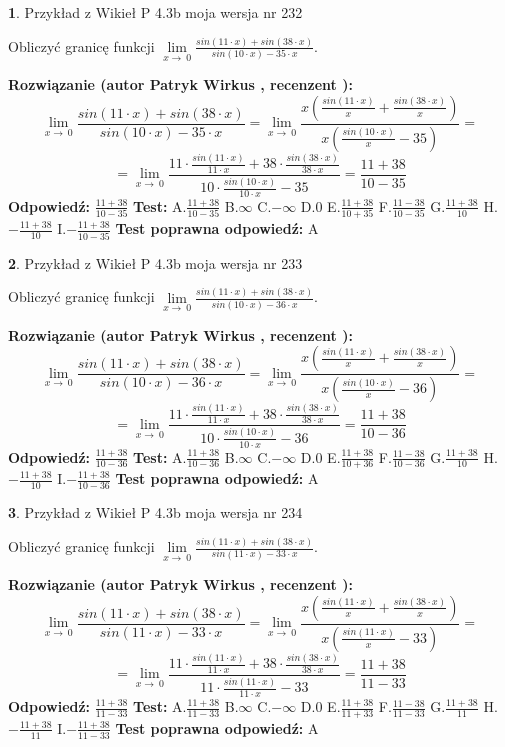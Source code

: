 \documentclass[12pt, a4paper]{article}
\theoremstyle{definition} %
\newtheorem{zad}{}
\newcommand{\zadStart}[1]{\begin{zad}#1\newline}
\newcommand{\zadStop}{\end{zad}}
\newcommand{\rozwStart}[2]{\noindent \textbf{Rozwiązanie (autor #1 , recenzent #2): }\newline}
\newcommand{\rozwStop}{\newline}
\newcommand{\odpStart}{\noindent \textbf{Odpowiedź:}\newline}
\newcommand{\odpStop}{\newline}
\newcommand{\testStart}{\noindent \textbf{Test:}\newline}
\newcommand{\testStop}{\newline}
\newcommand{\kluczStart}{\noindent \textbf{Test poprawna odpowiedź:}\newline}
\newcommand{\kluczStop}{\newline}
\begin{document}
\zadStart{Przykład z Wikieł P 4.3b moja wersja nr 232}


Obliczyć granicę funkcji $\lim\limits_{x\to\ 0}\frac{sin(11 \cdot x)+sin(38 \cdot x)}{sin(10 \cdot x)-35 \cdot x}$.
\zadStop
\rozwStart{Patryk Wirkus}{}
$$\lim\limits_{x\to\ 0}\frac{sin(11 \cdot x)+sin(38 \cdot x)}{sin(10 \cdot x)-35 \cdot x}=\lim\limits_{x\to\ 0}\frac{x(\frac{sin(11 \cdot x)}{x}+\frac{sin(38 \cdot x)}{x})}{x(\frac{sin(10 \cdot x)}{x}-35)}=$$
$$=\lim\limits_{x\to\ 0}\frac{11 \cdot \frac{sin(11 \cdot x)}{11 \cdot x}+38 \cdot \frac{sin(38 \cdot x)}{38 \cdot x}}{10 \cdot \frac{sin(10 \cdot x)}{10 \cdot x}-35}=\frac{11+38}{10-35}$$
\rozwStop
\odpStart
$\frac{11+38}{10-35}$
\odpStop
\testStart
A.$\frac{11+38}{10-35}$
B.$\infty$
C.$-\infty$
D.$0$
E.$\frac{11+38}{10+35}$
F.$\frac{11-38}{10-35}$
G.$\frac{11+38}{10}$
H.$-\frac{11+38}{10}$
I.$-\frac{11+38}{10-35}$
\testStop
\kluczStart
A
\kluczStop



\zadStart{Przykład z Wikieł P 4.3b moja wersja nr 233}


Obliczyć granicę funkcji $\lim\limits_{x\to\ 0}\frac{sin(11 \cdot x)+sin(38 \cdot x)}{sin(10 \cdot x)-36 \cdot x}$.
\zadStop
\rozwStart{Patryk Wirkus}{}
$$\lim\limits_{x\to\ 0}\frac{sin(11 \cdot x)+sin(38 \cdot x)}{sin(10 \cdot x)-36 \cdot x}=\lim\limits_{x\to\ 0}\frac{x(\frac{sin(11 \cdot x)}{x}+\frac{sin(38 \cdot x)}{x})}{x(\frac{sin(10 \cdot x)}{x}-36)}=$$
$$=\lim\limits_{x\to\ 0}\frac{11 \cdot \frac{sin(11 \cdot x)}{11 \cdot x}+38 \cdot \frac{sin(38 \cdot x)}{38 \cdot x}}{10 \cdot \frac{sin(10 \cdot x)}{10 \cdot x}-36}=\frac{11+38}{10-36}$$
\rozwStop
\odpStart
$\frac{11+38}{10-36}$
\odpStop
\testStart
A.$\frac{11+38}{10-36}$
B.$\infty$
C.$-\infty$
D.$0$
E.$\frac{11+38}{10+36}$
F.$\frac{11-38}{10-36}$
G.$\frac{11+38}{10}$
H.$-\frac{11+38}{10}$
I.$-\frac{11+38}{10-36}$
\testStop
\kluczStart
A
\kluczStop



\zadStart{Przykład z Wikieł P 4.3b moja wersja nr 234}


Obliczyć granicę funkcji $\lim\limits_{x\to\ 0}\frac{sin(11 \cdot x)+sin(38 \cdot x)}{sin(11 \cdot x)-33 \cdot x}$.
\zadStop
\rozwStart{Patryk Wirkus}{}
$$\lim\limits_{x\to\ 0}\frac{sin(11 \cdot x)+sin(38 \cdot x)}{sin(11 \cdot x)-33 \cdot x}=\lim\limits_{x\to\ 0}\frac{x(\frac{sin(11 \cdot x)}{x}+\frac{sin(38 \cdot x)}{x})}{x(\frac{sin(11 \cdot x)}{x}-33)}=$$
$$=\lim\limits_{x\to\ 0}\frac{11 \cdot \frac{sin(11 \cdot x)}{11 \cdot x}+38 \cdot \frac{sin(38 \cdot x)}{38 \cdot x}}{11 \cdot \frac{sin(11 \cdot x)}{11 \cdot x}-33}=\frac{11+38}{11-33}$$
\rozwStop
\odpStart
$\frac{11+38}{11-33}$
\odpStop
\testStart
A.$\frac{11+38}{11-33}$
B.$\infty$
C.$-\infty$
D.$0$
E.$\frac{11+38}{11+33}$
F.$\frac{11-38}{11-33}$
G.$\frac{11+38}{11}$
H.$-\frac{11+38}{11}$
I.$-\frac{11+38}{11-33}$
\testStop
\kluczStart
A
\kluczStop
\end{document}
